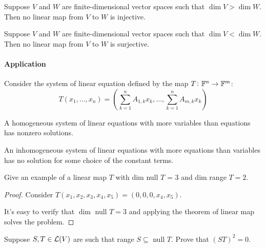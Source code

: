 \documentclass{extarticle}
\begin{document}
\begin{corollary}
    Suppose \(V\) and \(W\) are finite-dimensional vector spaces such that 
    \(\dim V > \dim W\). Then no linear map from \(V\) to \(W\) is injective. 
\end{corollary}

\begin{corollary}
    Suppose \(V\) and \(W\) are finite-dimensional vector spaces such that 
    \(\dim V < \dim W\). Then no linear map from \(V\) to \(W\) is surjective. 
\end{corollary}

\noindent
\paragraph{Application} Consider the system of linear equation defined by the map \(T \colon \mathbb{F}^n \to \mathbb{F}^m\):
\[T(x_1, \ldots, x_n) = \left(\sum_{k=1}^{n}A_{1, k}x_k, \ldots, \sum_{k=1}^{n}A_{m, k}x_k \right)\]

\begin{corollary}
    A homogeneous system of linear equations with more variables than equations has nonzero solutions.
\end{corollary}

\begin{corollary}
    An inhomogeneous system of linear equations with more equations than variables has no 
    solution for some choice of the constant terms. 
\end{corollary}

\begin{problem}{1}
    Give an example of a linear map \(T\) with dim null \(T\) = 3 and dim range \(T = 2\). 
\end{problem}

\begin{proof}
Consider \(T(x_1, x_2, x_3, x_4, x_5) = (0,0,0,x_4,x_5)\). 

It's easy to verify that \(\dim\) null \(T = 3\) and applying the theorem of linear map solves the problem.
\end{proof}

\begin{problem}{2}
    Suppose \(S, T \in \mathcal{L}(V)\) are such that range \(S \subseteq \) null \(T\). Prove that 
    \((ST)^2 = 0\).
\end{problem}
\end{document}
